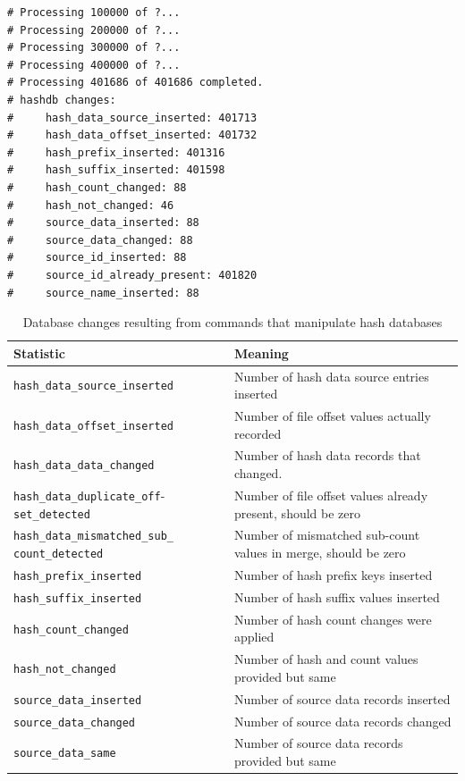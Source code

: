\documentclass[11pt,fleqn]{article} %
\begin{document}
\lstset{style=customfile}
\begin{lstlisting}[float, caption={Example report of a database change from an import operation}, label=DatabaseChanges]
# Processing 100000 of ?...
# Processing 200000 of ?...
# Processing 300000 of ?...
# Processing 400000 of ?...
# Processing 401686 of 401686 completed.
# hashdb changes:
#     hash_data_source_inserted: 401713
#     hash_data_offset_inserted: 401732
#     hash_prefix_inserted: 401316
#     hash_suffix_inserted: 401598
#     hash_count_changed: 88
#     hash_not_changed: 46
#     source_data_inserted: 88
#     source_data_changed: 88
#     source_id_inserted: 88
#     source_id_already_present: 401820
#     source_name_inserted: 88
\end{lstlisting}

\begin{table}[!ht]
\centering
\caption{Database changes resulting from commands that manipulate hash databases}
\label{tab:changesTracked}
\begin{tabular}{|p{5 cm}|p{8.8 cm}|}
\hline \hline
\textbf{Statistic} & \textbf{Meaning} \\
\hline

\verb+hash_data_source_inserted+ &  Number of hash data source entries inserted\\
\hline
\verb+hash_data_offset_inserted+ &  Number of file offset values actually recorded\\
\hline
\verb+hash_data_data_changed+ &  Number of hash data records that changed.\\
\hline
\verb+hash_data_duplicate_off+- \verb+set_detected+ &  Number of file offset values already present, should be zero\\
\hline
\verb+hash_data_mismatched_sub_+ \verb+count_detected+ &  Number of mismatched sub-count values in merge, should be zero\\
\hline

\verb+hash_prefix_inserted+ &  Number of hash prefix keys inserted\\
\hline
\verb+hash_suffix_inserted+ &  Number of hash suffix values inserted\\
\hline
\verb+hash_count_changed+ &  Number of hash count changes were applied\\
\hline
\verb+hash_not_changed+ &  Number of hash and count values provided but same\\
\hline

\verb+source_data_inserted+ &  Number of source data records inserted\\
\hline
\verb+source_data_changed+ &  Number of source data records changed\\
\hline
\verb+source_data_same+ &  Number of source data records provided but same\\
\hline


\end{tabular}
\end{table}
\end{document}
